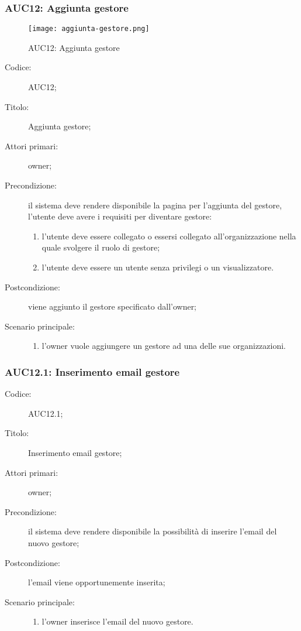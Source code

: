 \documentclass[../../../analisi-dei-requisiti.tex]{subfiles}
\begin{document}
\subsubsection{AUC12: Aggiunta gestore}%
\label{subs:AUC12}

\begin{figure}[H]
  \centering
  \texttt{[image: aggiunta-gestore.png]}
  \caption{AUC12: Aggiunta gestore}%
  \label{fig:AUC12}
\end{figure}

\begin{description}
  \item[Codice:] AUC12;
  \item[Titolo:] Aggiunta gestore;
  \item[Attori primari:] owner;
  \item[Precondizione:] il sistema deve rendere disponibile la pagina per l'aggiunta del gestore, l'utente deve avere i requisiti per diventare gestore:
  \begin{enumerate}
    \item l'utente deve essere collegato o essersi collegato all'organizzazione nella quale svolgere il ruolo di gestore;
    \item l'utente deve essere un utente senza privilegi o un visualizzatore.
  \end{enumerate}
  \item[Postcondizione:] viene aggiunto il gestore specificato dall'owner;
  \item[Scenario principale:]
  \begin{enumerate}
    \item l'owner vuole aggiungere un gestore ad una delle sue organizzazioni.
  \end{enumerate}
\end{description}

\subsubsection{AUC12.1: Inserimento email gestore}%
\label{subs:AUC12.1}
\begin{description}
  \item[Codice:] AUC12.1;
  \item[Titolo:] Inserimento email gestore;
  \item[Attori primari:] owner;
  \item[Precondizione:] il sistema deve rendere disponibile la possibilità di inserire l'email del nuovo gestore;
  \item[Postcondizione:] l'email viene opportunemente inserita;
  \item[Scenario principale:]
  \begin{enumerate}
    \item l'owner inserisce l'email del nuovo gestore.
  \end{enumerate}
\end{description}
\end{document}
